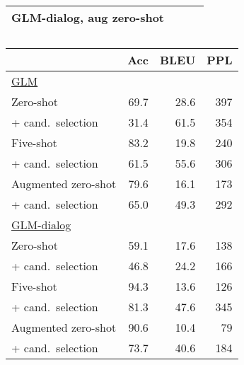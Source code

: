 \begin{table*}
\begin{subtable}{.58\linewidth}
\begin{tabular}{l r r r}
        GLM-dialog, aug zero-shot \\
        \bottomrule
        \end{tabular}
        \label{tab:prior-methods}
        \caption{}
    \end{subtable}
    \begin{subtable}{.40\linewidth}
    \centering \small 
        \begin{tabular}{l r r r}
        \toprule
         & Acc & BLEU & PPL\\
        \midrule
        \underline{GLM} \\
        Zero-shot & 69.7 & 28.6 & 397 \\
        + cand.~selection & 31.4 & 61.5 & 354\\
        Five-shot & 83.2 & 19.8 & 240\\
        + cand.~selection & 61.5 & 55.6 & 306\\
        Augmented zero-shot & 79.6 & 16.1 & 173\\
        + cand.~selection & 65.0 & 49.3 & 292\\
        \midrule
        \underline{GLM-dialog} \\
        Zero-shot & 59.1 & 17.6 & 138\\
        + cand.~selection & 46.8 & 24.2 & 166\\
        Five-shot & 94.3 & 13.6 & 126\\
        + cand.~selection & 81.3 & 47.6 & 345\\
        Augmented zero-shot & 90.6 & 10.4 & 79\\
        + cand.~selection & 73.7 & 40.6 & 184\\
        \bottomrule
        \end{tabular}
        \caption{}
        \label{tab:ablation}
    \end{subtable}
\end{table*}
